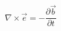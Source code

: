 \begin{equation}
\nabla \times \vec{e} = -\frac{\partial \vec{b}}{\partial t}
\label{eq:faraday-time}
\end{equation}

